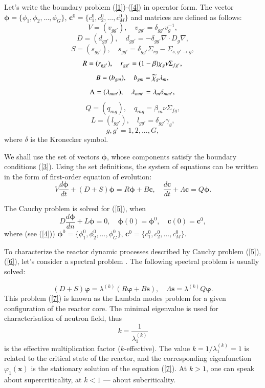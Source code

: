 \documentclass{aip-cp}
\begin{document}
Let's write the boundary problem (\ref{1})-(\ref{4}) in operator form. The vector $\bm \phi = \{\phi_1, \phi_2, ..., \phi_G\}$, $\bm c^0 = \{ c_1^0,  c_2^0, ...,  c_M^0 \}$ and matrices are defined as follows:
\[
 V = (v_{g g'}),
 \quad v_{g g'} = \delta_{g g'} v_g^{-1},
\] 
\[
 D = (d_{g g'}),
 \quad d_{g g'} = - \delta_{g g'} \nabla \cdot D_g \nabla,
\] 
\[
 S = (s_{g g'}),
 \quad  s_{g g'} =  \delta_{g g'} \Sigma_{rg} - \Sigma_{s,g'\rightarrow g} ,
\] 
\[
 R = (r_{g g'}),
 \quad  r_{g g'} = (1-\beta)\chi_g \nu \Sigma_{fg'}, \\
\]
\[
 B = (b_{g m}),
 \quad b_{g m} = \widetilde{\chi}_g \lambda_m, \\
\] 
\[ 
 \Lambda = (\lambda_{m m'}),
 \quad  \lambda_{m m'} = \lambda_m \delta_{m m'}, \\
\]
\[ 
 Q = (q_{mg}),
 \quad  q_{mg} = \beta_m \nu \Sigma_{fg},
\]
\[
L = (l_{g g'}), \quad l_{g g'} = \delta_{g g'} \gamma_g,
\]
\[
g, g' = 1,2, ..., G,
\] 
where $\delta$ is the Kronecker symbol.

We shall use the set of vectors $\bm \phi$, whose components satisfy the boundary conditions (\ref{3}). Using the set definitions, the system of equations can be written in the form of first-order equation of evolution:
\begin{equation}\label{5}
V \frac{d \bm \phi}{d t} + (D+S) \bm \phi = R \bm \phi + B\bm c,
\quad
\frac{d \bm c}{d t} + \Lambda \bm c = Q \bm \phi. 
\end{equation}  

The Cauchy problem is solved for (\ref{5}), when
\begin{equation}\label{6}
D\frac{d \bm\phi}{d n} + L \bm \phi = 0, 
\quad \bm \phi(0) = \bm \phi^0,
\quad  \bm c(0) = \bm c^0,
\end{equation} 
where (see (\ref{4})) $\bm \phi^0 = \{ \phi_1^0,  \phi_2^0, ...,  \phi_G^0 \}$, $\bm c^0 = \{ c_1^0,  c_2^0, ...,  c_M^0 \}$.

To characterize the reactor dynamic processes described by Cauchy problem 
(\ref{5}), (\ref{6}), let's consider a spectral 
problem \cite{Bell1970,stacey}. The following spectral problem is usually solved:

\begin{equation}\label{7}
 (D+S) \bm \varphi = \lambda^{(k)} \left ( R \bm \varphi  +  B \bm s \right ), 
 \quad
 \Lambda \bm s = \lambda^{(k)} Q \bm \varphi .
\end{equation}
This problem (\ref{7}) is known as the Lambda modes problem for a given configuration of the reactor core.
The minimal eigenvalue is used for characterisation of neutron field, thus 
\[
 k = \frac{1}{\lambda^{(k)}_1}  
\] 
is the effective multiplication factor ($k$-effective).
The value $k = 1 / \lambda^{(k)}_1 = 1$ is related to the critical state of the reactor, and the corresponding eigenfunction $\varphi_1(\bm x)$ is the stationary solution of the equation (\ref{7}).
At $k > 1$, one can speak about supercriticality, at $k < 1$  --- about subcriticality.
\end{document}
